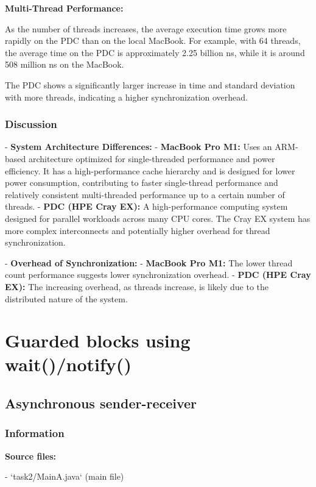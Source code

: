 \documentclass{article}
\begin{document}
\textbf{Multi-Thread Performance:} 

 As the number of threads increases, the average execution time grows more rapidly on the PDC than on the local MacBook. For example, with 64 threads, the average time on the PDC is approximately 2.25 billion ns, while it is around 508 million ns on the MacBook.
  
  The PDC shows a significantly larger increase in time and standard deviation with more threads, indicating a higher synchronization overhead.

\subsubsection{Discussion}

- \textbf{System Architecture Differences:}
  - \textbf{MacBook Pro M1:} Uses an ARM-based architecture optimized for single-threaded performance and power efficiency. It has a high-performance cache hierarchy and is designed for lower power consumption, contributing to faster single-thread performance and relatively consistent multi-threaded performance up to a certain number of threads.
  - \textbf{PDC (HPE Cray EX):} A high-performance computing system designed for parallel workloads across many CPU cores. The Cray EX system has more complex interconnects and potentially higher overhead for thread synchronization.

- \textbf{Overhead of Synchronization:}
  - \textbf{MacBook Pro M1:} The lower thread count performance suggests lower synchronization overhead.
  - \textbf{PDC (HPE Cray EX):} The increasing overhead, as threads increase, is likely due to the distributed nature of the system.




\newpage
\section{Guarded blocks using wait()/notify()}


\subsection{Asynchronous sender-receiver}

\subsubsection{Information}
\textbf{Source files:}

- `task2/MainA.java` (main file)
\end{document}
